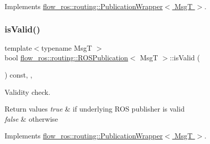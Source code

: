 Implements \hyperlink{classflow__ros_1_1routing_1_1_publication_wrapper_a86fdc857e02347e862dbbb113e5a6cb6}{flow\+\_\+ros\+::routing\+::\+Publication\+Wrapper$<$ Msg\+T $>$}.

\mbox{\label{classflow__ros_1_1routing_1_1_r_o_s_publication_aa7a132708199fe33bbb1420211aa7f78}} 
\subsubsection{\texorpdfstring{is\+Valid()}{isValid()}}
{\footnotesize\ttfamily template$<$typename MsgT $>$ \\
bool \hyperlink{classflow__ros_1_1routing_1_1_r_o_s_publication}{flow\+\_\+ros\+::routing\+::\+R\+O\+S\+Publication}$<$ MsgT $>$\+::is\+Valid (\begin{DoxyParamCaption}{ }\end{DoxyParamCaption}) const\hspace{0.3cm}{\ttfamily [inline]}, {\ttfamily [override]}, {\ttfamily [virtual]}}



Validity check. 


\begin{DoxyRetVals}{Return values}
{\em true} & if underlying R\+OS publisher is valid \\
\hline
{\em false} & otherwise \\
\hline
\end{DoxyRetVals}


Implements \hyperlink{classflow__ros_1_1routing_1_1_publication_wrapper_afc33bf27092f8e8188e3f7955a6b7c97}{flow\+\_\+ros\+::routing\+::\+Publication\+Wrapper$<$ Msg\+T $>$}.

\mbox{\label{classflow__ros_1_1routing_1_1_r_o_s_publication_a1ad3cf68c465a909399bb4496e561f0b}} 

